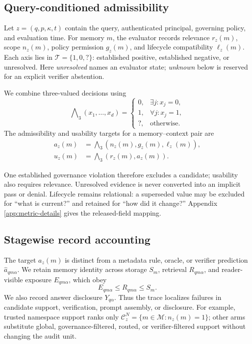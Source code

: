 \documentclass{article}
\begin{document}
\subsection{Query-conditioned admissibility}

Let $z=(q,p,\kappa,t)$ contain the query, authenticated principal, governing policy,
and evaluation time.  For memory $m$, the evaluator records relevance $r_z(m)$,
scope $n_z(m)$, policy permission $g_z(m)$, and lifecycle compatibility $\ell_z(m)$.
Each axis lies in $\mathcal{T}=\{1,0,?\}$: established positive, established
negative, or unresolved.  Here \emph{unresolved} names an evaluator state;
\emph{unknown} below is reserved for an explicit verifier abstention.

We combine three-valued decisions using
\begin{equation}
\bigwedge\nolimits_{3}(x_1,\ldots,x_d)=
\begin{cases}
0, & \exists j:x_j=0,\\
1, & \forall j:x_j=1,\\
?, & \text{otherwise}.
\end{cases}
\label{eq:three-valued}
\end{equation}
The admissibility and usability targets for a memory--context pair are
\begin{align}
a_z(m)
&=\bigwedge\nolimits_{3}
  \left(n_z(m),g_z(m),\ell_z(m)\right),
\label{eq:admissible}\\
u_z(m)
&=\bigwedge\nolimits_{3}
  \left(r_z(m),a_z(m)\right).
\label{eq:usable}
\end{align}

One established governance violation therefore excludes a candidate; usability also
requires relevance.  Unresolved evidence is never converted into an implicit pass or
denial.  Lifecycle remains relational: a superseded value may be excluded for
``what is current?'' and retained for ``how did it change?''  Appendix
\ref{app:metric-details} gives the released-field mapping.

\subsection{Stagewise record accounting}

The target $a_z(m)$ is distinct from a metadata rule, oracle, or verifier prediction
$\widehat a_{qm\alpha}$.  We retain memory identity across storage $S_m$, retrieval
$R_{qm\alpha}$, and reader-visible exposure $E_{qm\alpha}$, which obey
\begin{equation}
E_{qm\alpha}\leq R_{qm\alpha}\leq S_m.
\label{eq:stage-order}
\end{equation}
We also record answer disclosure $Y_{q\alpha}$.  Thus the trace localizes failures in
candidate support, verification, prompt assembly, or disclosure.  For example,
trusted namespace support ranks only
$\mathcal{C}^{N}_z=\{m\in\mathcal{M}:n_z(m)=1\}$; other arms substitute global,
governance-filtered, routed, or verifier-filtered support without changing the audit
unit.
\end{document}
